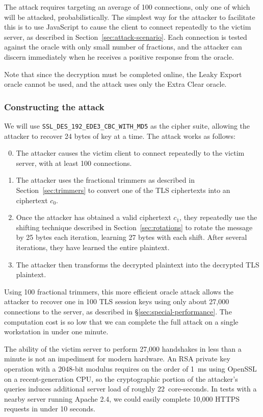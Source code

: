 The attack requires targeting
an average of 100 connections, only one of
which will be attacked, probabilistically.  The simplest
way for the attacker to facilitate this is to use JavaScript to cause
the client to connect repeatedly to the victim server, as described in
Section~\ref{sec:attack-scenario}.  Each connection is tested
against the oracle with only small number of fractions, and the attacker can discern
immediately when he receives a positive response from the oracle.

Note that since the decryption must be completed online, the Leaky Export oracle
cannot be used, and the attack uses only the Extra Clear oracle.

\subsubsection{Constructing the attack}
We will use \texttt{SSL\_DES\_192\_EDE3\_CBC\_WITH\_MD5} as the cipher suite, allowing the attacker to recover 24 bytes of key at a time.
The attack works as follows:

\begin{enumerate}
 \setcounter{enumi}{-1}
 \item The attacker causes the victim client to connect repeatedly to the
  victim server, with at least 100 connections.
 \item The attacker uses the fractional trimmers as described in
  Section~\ref{sec:trimmers} to convert one of the TLS ciphertexts
  into an \sslconform ciphertext $c_0$.
 \item Once the attacker has obtained a valid \ssltwo ciphertext $c_1$,
  they repeatedly use the shifting technique described in
  Section~\ref{sec:rotations} to rotate the message by 25 bytes each iteration,
  learning 27 bytes with each shift.  After several iterations, they have learned
  the entire plaintext.
 \item The attacker then transforms the decrypted \ssltwo plaintext into the decrypted TLS plaintext. 
\end{enumerate}

Using 100 fractional trimmers, this more efficient oracle attack allows
the attacker to recover one in 100 TLS session keys using only about
27,000 connections to the server, as described in
\S\ref{sec:special-performance}.  The computation cost is so low that
we can complete the full attack on a single workstation in under one
minute.

\ifext
The ability of the victim server to perform 27,000 handshakes in less than a
minute is not an impediment for modern hardware.  An RSA
private key operation with a 2048-bit modulus requires on the order of
1~ms using OpenSSL on a recent-generation CPU, so the cryptographic
portion of the attacker's queries induces additional server load of
roughly 22~core-seconds.  In tests with a nearby server running Apache
2.4, we could easily complete 10,000 HTTPS requests in under 10
seconds.
\fi
